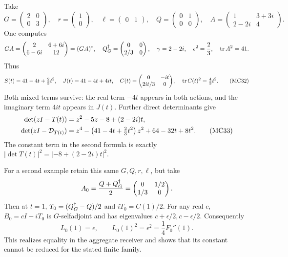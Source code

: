 \documentclass[11pt]{article}
\begin{document}
Take
\begin{equation}
 G=\begin{pmatrix}2&0\\0&3\end{pmatrix},\quad
 r=\begin{pmatrix}1\\0\end{pmatrix},\quad
 \ell=\begin{pmatrix}0&1\end{pmatrix},\quad
 Q=\begin{pmatrix}0&1\\0&0\end{pmatrix},\quad
 A=\begin{pmatrix}1&3+3i\\2-2i&4\end{pmatrix}.
 \tag{MC31}\label{sam:MC31}
\end{equation}
One computes
\[
 GA=\begin{pmatrix}2&6+6i\\6-6i&12\end{pmatrix}=(GA)^*,
 \quad Q^\dagger_G=\begin{pmatrix}0&0\\2/3&0\end{pmatrix},
 \quad \gamma=2-2i,\quad \epsilon^2=\frac23,\quad\operatorname{tr} A^2=41.
\]
Thus
\begin{equation}
 S(t)=41-4t+\tfrac23t^2,\quad
 J(t)=41-4t+4it,\quad
 C(t)=\begin{pmatrix}0&-it\\2it/3&0\end{pmatrix},\quad
 \operatorname{tr} C(t)^2=\tfrac43t^2.
 \tag{MC32}\label{sam:MC32}
\end{equation}
Both mixed terms survive: the real term \(-4t\) appears in both
actions, and the imaginary term \(4it\) appears in \(J(t)\).
Further direct determinants give
\begin{align}
 \det(zI-T(t))&=z^2-5z-8+(2-2i)t,\notag\\
 \det(zI-\mathcal D_{T(t)})
 &=z^4-\left(41-4t+\tfrac23t^2\right)z^2
       +64-32t+8t^2.
 \tag{MC33}\label{sam:MC33}
\end{align}
The constant term in the second formula is exactly
\(|\det T(t)|^2=|-8+(2-2i)t|^2\).

For a second example retain this same \(G,Q,r,\ell\), but take
\[
 A_0=\frac{Q+Q^\dagger_G}{2}
   =\begin{pmatrix}0&1/2\\1/3&0\end{pmatrix}.
\]
Then at \(t=1\),
\(T_0=(Q^\dagger_G-Q)/2\) and \(iT_0=C(1)/2\).
For any real \(c\), \(B_0=cI+iT_0\) is \(G\)-selfadjoint and
has eigenvalues \(c+\epsilon/2,c-\epsilon/2\). Consequently
\begin{equation}
 L_0(1)=\epsilon,\qquad
 L_0(1)^2=\epsilon^2=\frac14F_0''(1).
 \tag{MC34}\label{sam:MC34}
\end{equation}
This realizes equality in the aggregate receiver and shows that its
constant cannot be reduced for the stated finite family.
\end{document}

